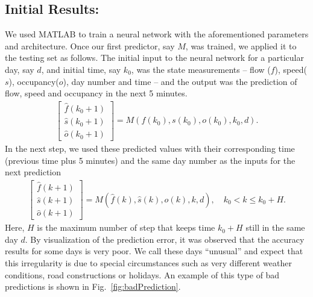\documentclass[twocolumn,10pt]{asme2e}
\begin{document}
\subsection{Initial Results:}\label{sec:initial}
We used MATLAB to train a neural network with the aforementioned parameters and architecture. Once our first predictor, say $M$, was trained, we applied it to the testing set as follows. The initial input to the neural network for a particular day, say $d$, and initial time, say $k_0$, was the state measurements -- flow ($f$), speed($s$), occupancy($o$), day number and time -- and the output was the prediction of flow, speed and occupancy in the next 5 minutes. 
\begin{align}
\begin{bmatrix}
\hat{f}(k_0+1)\\\hat{s}(k_0+1)\\\hat{o}(k_0+1)
\end{bmatrix} = M(f(k_0),s(k_0), o(k_0), k_0, d).
\end{align}
In the next step, we used these predicted values with their corresponding time (previous time plus 5 minutes) and the same day number as the inputs for the next prediction
\begin{align}
\begin{bmatrix}
\hat{f}(k+1)\\\hat{s}(k+1)\\\hat{o}(k+1)
\end{bmatrix} = M(\hat{f}(k),\hat{s}(k), \hat{o}(k), k, d), \quad k_0<k\le k_0+H.
\end{align}
Here, $H$ is the maximum number of step that keeps time $k_0+H$ still in the same day $d$. By visualization of the prediction error, it was observed that the accuracy results for some days is very poor. We call these days ``unusual'' and expect that this irregularity is due to special circumstances such as very different weather conditions, road constructions or holidays. An example of this type of bad predictions is shown in Fig.~\ref{fig:badPrediction}.
\end{document}
